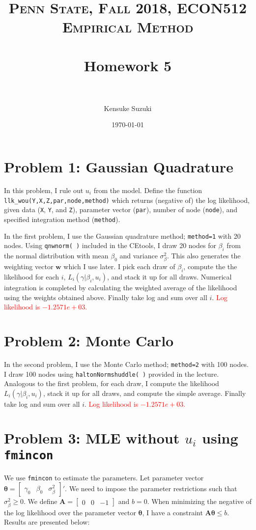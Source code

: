 \documentclass[11pt,letter]{article}
\title{	
\normalfont \normalsize 
\textsc{Penn State, Fall 2018, ECON512 Empirical Method} \\ [25pt] %
\horrule{0.5pt} \\[0.4cm] %
\huge Homework 5 \\ %
\horrule{2pt} \\[0.5cm] %
}
\author{Kensuke Suzuki} %
\date{\normalsize\today} %
\newcommand{\vect}[1]{\boldsymbol{\mathbf{#1}}}
\newcounter{lem}[section] \setcounter{lem}{0}
\newcommand{\bmat}[1]{\begin{bmatrix} #1 \end{bmatrix}}%
\newcommand{\code}[1]{\texttt{#1}}
\begin{document}
\maketitle %


\section*{Problem 1: Gaussian Quadrature}

In this problem, I rule out $u_i$ from the model. Define the function \code{llk\_wou(Y,X,Z,par,node,method)} which returns (negative of) the log likelihood, given data (\code{X}, \code{Y}, and \code{Z}), parameter vector (\code{par}), number of node (\code{node}), and specified integration method (\code{method}). 

In the first problem, I use the Gaussian quadrature method; \code{method=1} with 20 nodes. Using \code{qnwnorm( )} included in the CEtools, I draw 20 nodes for $\beta_i$ from the normal distribution with mean $\beta_0$ and variance $\sigma_\beta^2$. This also generates the weighting vector $\vect{w}$ which I use later. I pick each draw of $\beta_i$, compute the the likelihood for each $i$, $L_i(\gamma|\beta_i,u_i)$, and stack it up for all draws. Numerical integration is completed by calculating the weighted average of the likelihood  using the weights obtained above. Finally take log and sum over all $i$. \textcolor{red}{Log likelihood is $-1.2571e+03$.}

\section*{Problem 2: Monte Carlo}


In the second problem, I use the Monte Carlo method; \code{method=2} with 100 nodes. I draw 100 nodes using \code{haltonNormshuddle( )} provided in the lecture. Analogous to the first problem, for each draw, I compute the likelihood  $L_i(\gamma|\beta_i,u_i)$, stack it up for all draws, and compute the simple average. Finally take log and sum over all $i$. \textcolor{red}{Log likelihood is $-1.2571e+03$.}

\section*{Problem 3: MLE without $u_i$ using \code{fmincon}}


We use \code{fmincon} to estimate the parameters. Let parameter vector $\vect{\theta} = \bmat{\gamma_0 & \beta_0 & \sigma_\beta^2}'$. We need to impose the parameter restrictions such that $\sigma_\beta^2\geq0$. We define $\vect{A}=\bmat{0 & 0 & -1}$ and $b=0$. When minimizing the negative of the log likelihood over the parameter vector $\vect{\theta}$, I have a constraint $\vect{A}\vect{\theta} \leq b$.  Results are presented below:
\end{document}
